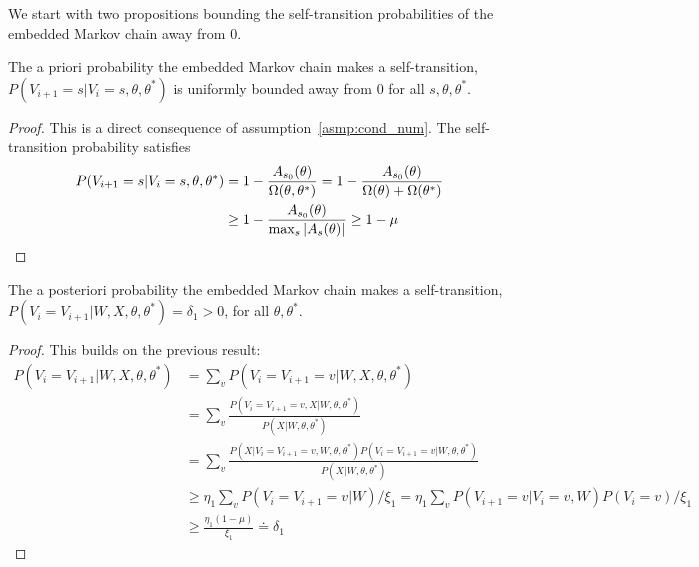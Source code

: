 We start with two propositions bounding the self-transition probabilities
of the embedded Markov chain away from $0$. 
\begin{proposition}
The a priori probability the embedded Markov chain makes a self-transition,
$P(V_{i + 1}=s|V_i=s,\theta,\theta^*)$ is uniformly bounded away
from $0$ for all $s,\theta,\theta^*$.
\end{proposition}
\begin{proof}
  This is a direct consequence of assumption~\ref{asmp:cond_num}. The
  self-transition probability satisfies
  \begin{align*}
  P(V_{i + 1}=s|V_i=s,\theta,\theta^*) &= 
    1 - \frac{A_{s_0}(\theta)}{\Omega(\theta, \theta^*)} 
    = 1 - \frac{A_{s_0}(\theta)}{\Omega(\theta) + \Omega(\theta^*)} \\
    & \ge 1-\frac{A_{s_0}(\theta)}{{\max_s |A_s(\theta)|}} \ge 1 - \mu
  \end{align*}
\end{proof}
\begin{proposition}
The a posteriori probability the embedded Markov chain makes a 
self-transition,
$P(V_i = V_{i + 1} | W, X, \theta, \theta^*) = \delta_1 > 0$,
for %
all $\theta,\theta^*$. 
\end{proposition}
\begin{proof} This builds on the previous result:
\begin{align*}
  P(V_i = V_{i + 1} | W, X, \theta, \theta^*) &= \sum_v P(V_i = V_{i + 1} = v | W, X, \theta, \theta^*)\\
& =\sum_v \frac{P(V_i = V_{i + 1} = v, X | W, \theta, \theta^*)}{P(X | W, \theta, \theta^*)} \\
&=\sum_v \frac{P(X | V_i = V_{i + 1} = v, W, \theta, \theta^*)P( V_i = V_{i + 1} = v|W, \theta, \theta^*)}{P(X | W, \theta, \theta^*)}\\
& \geq \eta_1\sum_v P(V_i = V_{i + 1} = v | W) /\xi_1 =  \eta_1 \sum_v P(V_{i + 1} = v | V_i = v, W)P(V_i = v) /\xi_1 \\
& \geq \frac{\eta_1 (1 - \mu)}{\xi_1} \doteq \delta_1 
\end{align*}
\end{proof}


